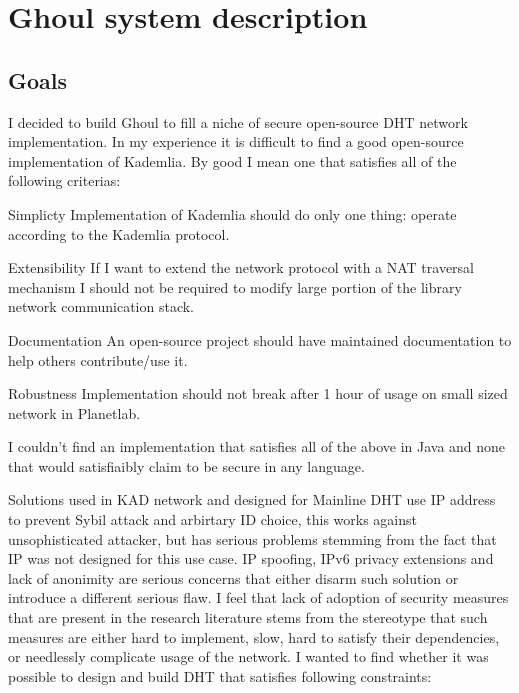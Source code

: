 \chapter{Ghoul system description}
\section{Goals}
I decided to build Ghoul to fill a niche of secure open-source DHT network
implementation. In my experience it is difficult to find a good open-source
implementation of Kademlia. By good I mean one that satisfies all of the
following criterias:

\begin{description}
  \item{Simplicty} Implementation of Kademlia should do only one thing: operate
    according to the Kademlia protocol.
  \item{Extensibility} If I want to extend the network protocol with a NAT
    traversal mechanism I should not be required to modify large portion of the
    library network communication stack.
  \item{Documentation} An open-source project should have maintained
    documentation to help others contribute/use it.
  \item{Robustness} Implementation should not break after 1 hour of usage on
    small sized network in Planetlab.
\end{description}

I couldn't find an implementation that satisfies all of the above in Java and
none that would satisfiaibly claim to be secure in any language.

Solutions used in KAD network and designed for Mainline DHT use IP address to
prevent Sybil attack and arbirtary ID choice, this works against unsophisticated
attacker, but has serious problems stemming from the fact that IP was not
designed for this use case. IP spoofing, IPv6 privacy extensions and lack of
anonimity are serious concerns that either disarm such solution or introduce a
different serious flaw. I feel that lack of adoption of security measures
that are present in the research literature stems from the stereotype that such
measures are either hard to implement, slow, hard to satisfy their dependencies,
or needlessly complicate usage of the network. I wanted to find whether it was
possible to design and build DHT that satisfies following constraints:

